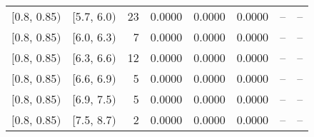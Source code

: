 \begin{longtable}{| l | l | r | r | r | r | r | r |}
        $[$0.8, 0.85$)$ & $[$5.7, 6.0$)$ & 23 & 0.0000 & 0.0000 & 0.0000 & -- & -- \\
        $[$0.8, 0.85$)$ & $[$6.0, 6.3$)$ & 7 & 0.0000 & 0.0000 & 0.0000 & -- & -- \\
        $[$0.8, 0.85$)$ & $[$6.3, 6.6$)$ & 12 & 0.0000 & 0.0000 & 0.0000 & -- & -- \\
        $[$0.8, 0.85$)$ & $[$6.6, 6.9$)$ & 5 & 0.0000 & 0.0000 & 0.0000 & -- & -- \\
        $[$0.8, 0.85$)$ & $[$6.9, 7.5$)$ & 5 & 0.0000 & 0.0000 & 0.0000 & -- & -- \\
        $[$0.8, 0.85$)$ & $[$7.5, 8.7$)$ & 2 & 0.0000 & 0.0000 & 0.0000 & -- & -- \\
\end{longtable}
